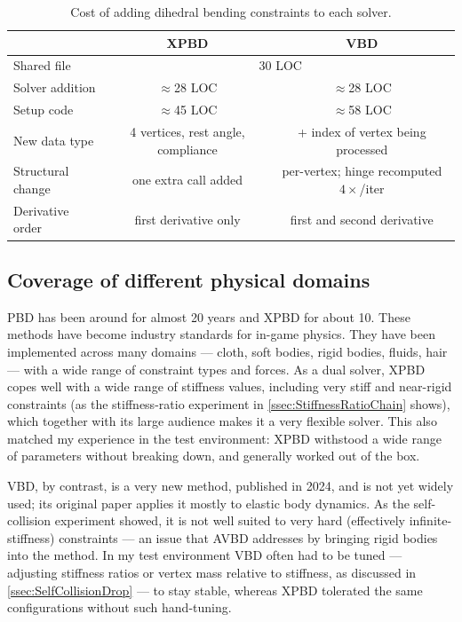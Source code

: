 \begin{table}[ht]
    \centering
    \begin{tabular}{l c c}
        \toprule
                            & XPBD                                  & VBD \\
        \midrule
        Shared file         & \multicolumn{2}{c}{30 LOC} \\
        Solver addition     & $\approx$28 LOC                       & $\approx$28 LOC \\
        Setup code          & $\approx$45 LOC                       & $\approx$58 LOC \\
        New data type       & 4 vertices, rest angle, compliance    & + index of vertex being processed \\
        Structural change   & one extra call added                  & per-vertex; hinge recomputed $4\times$/iter \\
        Derivative order    & first derivative only                 & first and second derivative \\
        \bottomrule
    \end{tabular}
    \caption{Cost of adding dihedral bending constraints to each solver.}
    \label{tab:Extension}
\end{table}

\subsection{Coverage of different physical domains}
\label{ssec:DomainCoverage}

PBD has been around for almost 20 years and XPBD for about 10. These methods have
become industry standards for in-game physics. They have been implemented across
many domains --- cloth, soft bodies, rigid bodies, fluids, hair --- with a wide
range of constraint types and forces. As a dual solver, XPBD copes well with a
wide range of stiffness values, including very stiff and near-rigid constraints
(as the stiffness-ratio experiment in \autoref{ssec:StiffnessRatioChain} shows),
which together with its large audience makes it a very flexible solver. This also
matched my experience in the test environment: XPBD withstood a wide range of
parameters without breaking down, and generally worked out of the box.

VBD, by contrast, is a very new method, published in 2024, and is not yet widely
used; its original paper applies it mostly to elastic body dynamics. As the
self-collision experiment showed, it is not well suited to very hard (effectively
infinite-stiffness) constraints --- an issue that AVBD addresses by bringing
rigid bodies into the method. In my test environment VBD often had to be tuned
--- adjusting stiffness ratios or vertex mass relative to stiffness, as discussed in
\autoref{ssec:SelfCollisionDrop} --- to stay stable, whereas XPBD tolerated the
same configurations without such hand-tuning.